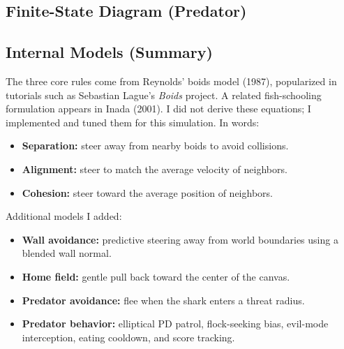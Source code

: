 \documentclass[11pt]{article}
\begin{document}
\subsection*{Finite-State Diagram (Predator)}
\begin{center}
\end{center}

\subsection*{Internal Models (Summary)}
The three core rules come from Reynolds' boids model (1987), popularized in tutorials such as Sebastian Lague's \emph{Boids} project. A related fish-schooling formulation appears in Inada (2001).
I did not derive these equations; I implemented and tuned them for this simulation. In words:

\begin{itemize}[leftmargin=1.25em]
  \item \textbf{Separation:} steer away from nearby boids to avoid collisions.
  \item \textbf{Alignment:} steer to match the average velocity of neighbors.
  \item \textbf{Cohesion:} steer toward the average position of neighbors.
\end{itemize}

Additional models I added:
\begin{itemize}[leftmargin=1.25em]
  \item \textbf{Wall avoidance:} predictive steering away from world boundaries using a blended wall normal.
  \item \textbf{Home field:} gentle pull back toward the center of the canvas.
  \item \textbf{Predator avoidance:} flee when the shark enters a threat radius.
  \item \textbf{Predator behavior:} elliptical PD patrol, flock-seeking bias, evil-mode interception, eating cooldown, and score tracking.
\end{itemize}
\end{document}
